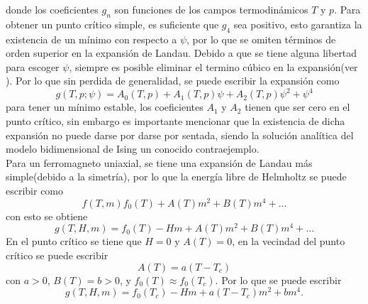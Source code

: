 \documentclass[a4paper]{article}
\begin{document}
donde los coeficientes $g_n$ son funciones de los campos termodinámicos $T$ y $p$. Para obtener un punto crítico simple, es suficiente que $g_4$ sea positivo, esto garantiza la existencia de un mínimo con respecto a $\psi$, por lo que se omiten términos de orden superior en la expansión de Landau. Debido a que se tiene alguna libertad para escoger $\psi$, siempre es posible eliminar el termino cúbico en la expansión(ver \cite{Salinas}). Por lo que sin perdida de generalidad, se puede escribir la expansión como
\begin{equation}
g(T,p;\psi)=A_0(T,p)+A_1(T,p)\psi+A_2(T,p)\psi^2+\psi^4
\end{equation}
para tener un mínimo estable, los coeficientes $A_1$ y $A_2$ tienen que ser cero en el punto crítico, sin embargo es importante mencionar que la existencia de dicha expansión no puede darse por darse por sentada, siendo la solución analítica del modelo bidimensional de Ising un conocido contraejemplo.\\
Para un ferromagneto uniaxial, se tiene una expansión de Landau más simple(debido a la simetría), por lo que la energía libre de Helmholtz se puede escribir como
\begin{equation}
f(T,m)f_0(T)+A(T)m^2+B(T)m^4+\hdots
\end{equation}
con esto se obtiene
\begin{equation}
g(T,H,m)=f_0(T)-H m+A(T)m^2+B(T)m^4+\hdots
\end{equation}
En el punto crítico se tiene que $H=0$ y $A(T)=0$, en la vecindad del punto crítico se puede escribir
\begin{equation}
A(T)=a(T-T_c)
\end{equation}
con $a>0$, $B(T)=b>0$, y $f_0(T)\approx f_0 (T_c)$. Por lo que se puede escribir
\begin{equation}
g(T,H,m)=f_0(T_c)-H m+a(T-T_c)m^2+b m^4.
\end{equation}
\end{document}
